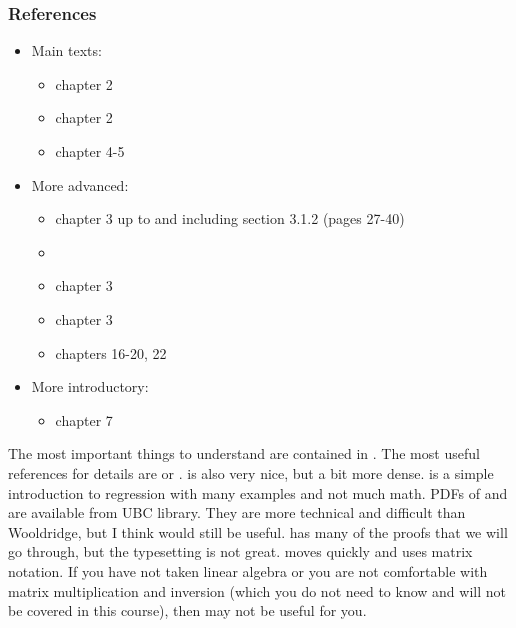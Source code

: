 \begin{frame}
  \frametitle{References}
  \begin{itemize}
  \item Main texts:
    \begin{itemize}
    \item \cite{ap2014} chapter 2
    \item \cite{w2013} chapter 2    
    \item \cite{sw2009} chapter 4-5
    \end{itemize}
  \item More advanced:
    \begin{itemize}
    \item \cite{ap2009} chapter 3 up to and including section 3.1.2
      (pages 27-40)
    \item \cite{bierens2010sreg}            
    \item \cite{abbring2001} chapter 3
    \item \cite{baltagi2002} chapter 3
    \item \cite{linton2017} chapters 16-20, 22
    \end{itemize}
  \item More introductory:
    \begin{itemize}
    \item \cite{dbc2012} chapter 7
    \end{itemize}
  \end{itemize}
\end{frame}

The most important things to understand are contained in
\cite{ap2014}. The most useful references for details are \cite{w2013} or
\cite{sw2009}.  \cite{ap2009} is also very nice, but a bit more
dense. \cite{dbc2012} is a simple introduction to regression with many
examples and not much math. PDFs of \cite{linton2017} and
\cite{baltagi2002} are available from UBC library. They are more
technical and difficult than Wooldridge, but I think would still be
useful.  \cite{bierens2010sreg} has many of the proofs that we will go
through, but the typesetting is not great.  \cite{abbring2001} moves
quickly and uses matrix notation. If you have not taken linear algebra
or you are not comfortable with matrix multiplication and inversion
(which you do not need to know and will not be covered in this
course), then \cite{abbring2001} may not be useful for you.

